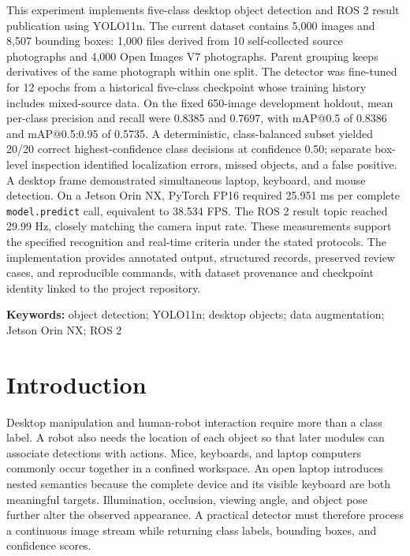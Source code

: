 \documentclass[12pt,a4paper]{article}
\makeatletter
\newcommand{\mAPfifty}{mAP@0.5}
\newcommand{\mAPcoco}{mAP@0.5:0.95}
\makeatother
\begin{document}
This experiment implements five-class desktop object detection and ROS 2 result publication using YOLO11n. The current dataset contains 5,000 images and 8,507 bounding boxes: 1,000 files derived from 10 self-collected source photographs and 4,000 Open Images V7 photographs. Parent grouping keeps derivatives of the same photograph within one split. The detector was fine-tuned for 12 epochs from a historical five-class checkpoint whose training history includes mixed-source data. On the fixed 650-image development holdout, mean per-class precision and recall were 0.8385 and 0.7697, with \mAPfifty{} of 0.8386 and \mAPcoco{} of 0.5735. A deterministic, class-balanced subset yielded 20/20 correct highest-confidence class decisions at confidence 0.50; separate box-level inspection identified localization errors, missed objects, and a false positive. A desktop frame demonstrated simultaneous laptop, keyboard, and mouse detection. On a Jetson Orin NX, PyTorch FP16 required 25.951 ms per complete \texttt{model.predict} call, equivalent to 38.534 FPS. The ROS 2 result topic reached 29.99 Hz, closely matching the camera input rate. These measurements support the specified recognition and real-time criteria under the stated protocols. The implementation provides annotated output, structured records, preserved review cases, and reproducible commands, with dataset provenance and checkpoint identity linked to the project repository.

\textbf{Keywords:} object detection; YOLO11n; desktop objects; data augmentation; Jetson Orin NX; ROS 2

\clearpage
{}

\section{Introduction}

Desktop manipulation and human-robot interaction require more than a class label. A robot also needs the location of each object so that later modules can associate detections with actions. Mice, keyboards, and laptop computers commonly occur together in a confined workspace. An open laptop introduces nested semantics because the complete device and its visible keyboard are both meaningful targets. Illumination, occlusion, viewing angle, and object pose further alter the observed appearance. A practical detector must therefore process a continuous image stream while returning class labels, bounding boxes, and confidence scores.
\end{document}

